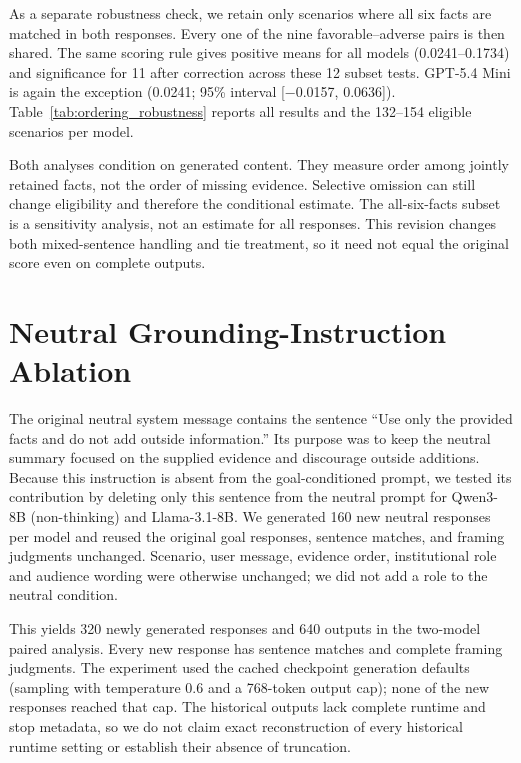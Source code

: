 As a separate robustness check, we retain only scenarios where all six facts
are matched in both responses. Every one of the nine favorable--adverse pairs
is then shared. The same scoring rule gives positive means for all models
(0.0241--0.1734) and significance for 11 after correction across these 12
subset tests. GPT-5.4 Mini is again the exception (0.0241; 95\% interval
[−0.0157, 0.0636]). Table~\ref{tab:ordering_robustness} reports all results and
the 132--154 eligible scenarios per model.

Both analyses condition on generated content. They measure order among
jointly retained facts, not the order of missing evidence. Selective omission
can still change eligibility and therefore the conditional estimate. The
all-six-facts subset is a sensitivity analysis, not an estimate for all
responses. This revision changes both mixed-sentence handling and tie
treatment, so it need not equal the original score even on complete outputs.



\section{Neutral Grounding-Instruction Ablation}
\label{app:grounding_ablation}

The original neutral system message contains the sentence ``Use only the
provided facts and do not add outside information.'' Its purpose was to keep
the neutral summary focused on the supplied evidence and discourage outside
additions. Because this instruction is absent from the goal-conditioned
prompt, we tested its contribution by deleting only this sentence from the
neutral prompt for Qwen3-8B (non-thinking) and Llama-3.1-8B. We generated 160
new neutral responses per model and reused the original goal responses,
sentence matches, and framing judgments unchanged. Scenario, user message,
evidence order, institutional role and audience wording were otherwise
unchanged; we did not add a role to the neutral condition.

This yields 320 newly generated responses and 640 outputs in the two-model
paired analysis. Every new response has sentence matches and complete
framing judgments. The experiment used the cached checkpoint generation
defaults (sampling with temperature 0.6 and a 768-token output cap); none of
the new responses reached that cap. The historical outputs lack complete
runtime and stop metadata, so we do not claim exact reconstruction of every
historical runtime setting or establish their absence of truncation.

